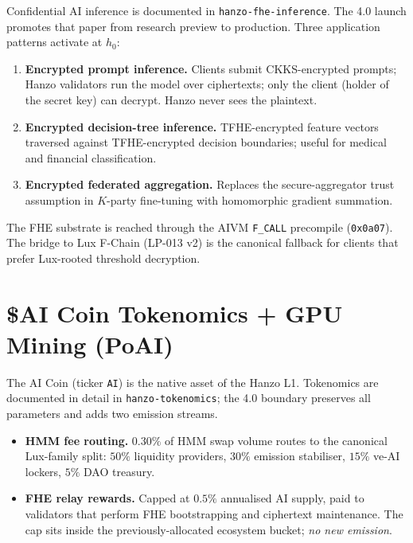 \documentclass[11pt,letterpaper]{article}
\begin{document}
Confidential AI inference is documented in
\texttt{hanzo-fhe-inference}. The 4.0 launch promotes that paper from
research preview to production. Three application patterns activate at
$h_0$:

\begin{enumerate}[leftmargin=*]
\item \textbf{Encrypted prompt inference.} Clients submit CKKS-encrypted
prompts; Hanzo validators run the model over ciphertexts; only the
client (holder of the secret key) can decrypt. Hanzo never sees the
plaintext.
\item \textbf{Encrypted decision-tree inference.} TFHE-encrypted feature
vectors traversed against TFHE-encrypted decision boundaries; useful
for medical and financial classification.
\item \textbf{Encrypted federated aggregation.} Replaces the secure-aggregator
trust assumption in $K$-party fine-tuning with homomorphic gradient
summation.
\end{enumerate}

The FHE substrate is reached through the AIVM \texttt{F\_CALL}
precompile (\texttt{0x0a07}). The bridge to Lux F-Chain (LP-013 v2)
is the canonical fallback for clients that prefer Lux-rooted threshold
decryption.

\section{\$AI Coin Tokenomics + GPU Mining (PoAI)}
\label{sec:tokenomics}

The AI Coin (ticker \texttt{AI}) is the native asset of the Hanzo L1.
Tokenomics are documented in detail in \texttt{hanzo-tokenomics}; the
4.0 boundary preserves all parameters and adds two emission streams.

\begin{itemize}[leftmargin=*]
\item \textbf{HMM fee routing.} $0.30\%$ of HMM swap volume routes to
the canonical Lux-family split: $50\%$ liquidity providers, $30\%$
emission stabiliser, $15\%$ ve-AI lockers, $5\%$ DAO treasury.
\item \textbf{FHE relay rewards.} Capped at $0.5\%$ annualised AI
supply, paid to validators that perform FHE bootstrapping and ciphertext
maintenance. The cap sits inside the previously-allocated ecosystem
bucket; \emph{no new emission}.
\end{itemize}
\end{document}
